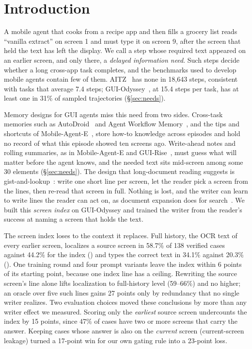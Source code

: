 \section{Introduction}
A mobile agent that cooks from a recipe app and then fills a grocery list reads ``vanilla extract'' on screen 1 and must type it on screen 9, after the screen that held the text has left the display. We call a step whose required text appeared on an earlier screen, and only there, a \emph{delayed information need}. Such steps decide whether a long cross-app task completes, and the benchmarks used to develop mobile agents contain few of them. AITZ~\citep{aitz} has none in 18,643 steps, consistent with tasks that average 7.4 steps; GUI-Odyssey~\citep{guiodyssey}, at 15.4 steps per task, has at least one in 31\% of sampled trajectories (\S\ref{sec:needs}).

Memory designs for GUI agents miss this need from two sides. Cross-task memories such as AutoDroid~\citep{autodroid} and Agent Workflow Memory~\citep{awm}, and the tips and shortcuts of Mobile-Agent-E~\citep{mobileagente}, store how-to knowledge across episodes and hold no record of what this episode showed ten screens ago. Write-ahead notes and rolling summaries, as in Mobile-Agent-E and GUI-Rise~\citep{guirise}, must guess what will matter before the agent knows, and the needed text sits mid-screen among some 30 elements (\S\ref{sec:needs}). The design that long-document reading suggests is gist-and-lookup~\citep{readagent}: write one short line per screen, let the reader pick a screen from the lines, then re-read that screen in full. Nothing is lost, and the writer can learn to write lines the reader can act on, as document expansion does for search~\citep{doc2query}. We built this \emph{screen index} on GUI-Odyssey and trained the writer from the reader's success at naming a screen that holds the text.

The screen index loses to the context it replaces. Full history, the OCR text of every earlier screen, localizes a source screen in 58.7\% of 138 verified cases against 44.2\% for the index () and types the correct text in 34.1\% against 20.3\% (). One training round and four prompt variants leave the index within 6 points of its starting point, because one index line has a ceiling. Rewriting the source screen's line alone lifts localization to full-history level (59--66\%) and no higher; an oracle over five such lines gains 27 points only by redundancy that no single writer realizes. Two evaluation choices moved these conclusions by more than any writer effect we measured. Scoring only the \emph{earliest} source screen undercounts the index by 15 points, since 47\% of cases have two or more screens that carry the answer. Keeping cases whose answer is also on the \emph{current} screen (current-screen leakage) turned a 17-point win for our own gating rule into a 23-point loss.

